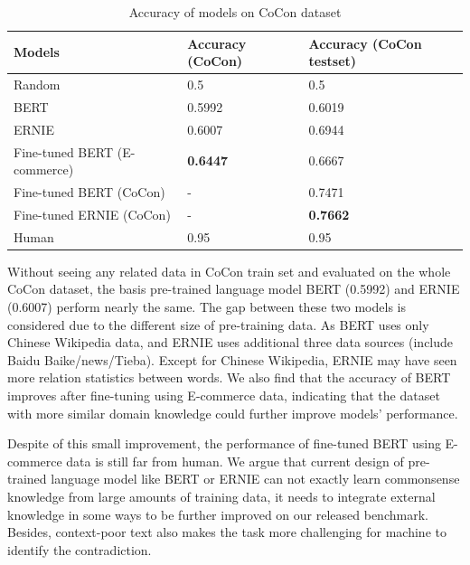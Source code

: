 \begin{table}
	\small
	\centering
	\begin{tabular}{p{4.3cm}p{1.4cm}p{1.4cm}}
		\toprule[1.1pt]
		Models & Accuracy (CoCon) & Accuracy (CoCon testset) \\
		\midrule[0.75pt]
		Random & 0.5 & 0.5\\
		BERT & 0.5992 & 0.6019\\
		ERNIE & 0.6007 & 0.6944\\
		Fine-tuned BERT (E-commerce)  & \textbf{0.6447} & 0.6667\\
		Fine-tuned BERT (CoCon) & - & 0.7471\\ %
		Fine-tuned ERNIE (CoCon) & - & \textbf{0.7662} \\ %
		\midrule[0.75pt]
		Human&0.95&0.95\\
		\bottomrule[1.1pt]
	\end{tabular}
	\caption{Accuracy of models on CoCon dataset}
	\label{tab:ExpRes}
\end{table}


Without seeing any related data in CoCon train set and evaluated on the whole CoCon dataset, the basis pre-trained language model BERT (0.5992) and ERNIE (0.6007) perform nearly the same. 
The gap between these two models is considered due to the different size of pre-training data. As BERT uses only Chinese Wikipedia data, and ERNIE uses %
additional three data sources (include Baidu Baike/news/Tieba).  Except for Chinese Wikipedia, ERNIE may have seen more relation statistics between words. We also find that the accuracy of BERT improves after fine-tuning using E-commerce data, indicating that the dataset with more similar domain knowledge could further improve models' performance.

Despite of this small improvement, the performance of fine-tuned BERT using E-commerce data is still far from human. We argue that current design of pre-trained language model like BERT or ERNIE can not exactly learn commonsense knowledge from large amounts of training data, it needs to integrate external knowledge in some ways to be further %
improved on our released benchmark. Besides, context-poor text also makes the task more challenging for machine to identify the contradiction.

